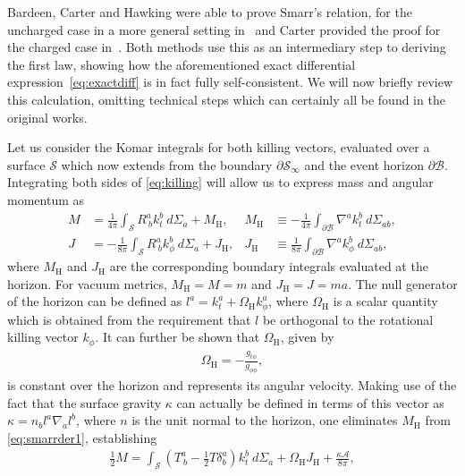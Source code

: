\documentclass[
twoside,
openright,
frontopenright
]{dmathesis}
\newcommand{\nn}{\nonumber}
\begin{document}
Bardeen, Carter and Hawking were able to prove Smarr's relation, for the
uncharged case in a more general setting in~\cite{Bardeen:1973gs} and Carter
provided the proof for the charged case
in~\cite{Carter:1973rla,Carter2010}. Both methods use this as an intermediary
step to deriving the first law, showing how the aforementioned exact
differential expression~\eqref{eq:exactdiff} is in fact fully
self-consistent. We will now briefly review this calculation, omitting technical
steps which can certainly all be found in the original works.

Let us consider the Komar integrals for both killing vectors, evaluated over a
surface $\mathcal{S}$ which now extends from the boundary
$\partial \mathcal{S}_\infty$ and the event horizon $\partial
\mathcal{B}$. Integrating both sides of \cref{eq:killing} will allow us to
express mass and angular momentum as
\begin{align}
  M &= \frac{1}{4\pi}\int_\mathcal{S} R^a_{~b}k^b_t ~d\Sigma_a + M_\mathrm{H}, 
  &M_\mathrm{H} &\equiv -\frac{1}{4\pi}\int_{\partial \mathcal{B}}\nabla^a k_t^b ~ d\Sigma_{ab},\nn\\
  J &= -\frac{1}{8\pi}\int_\mathcal{S} R^a_{~b}k^b_\phi ~d\Sigma_a + J_\mathrm{H}, 
  &J_\mathrm{H} &\equiv \frac{1}{8\pi}\int_{\partial\mathcal{B}}\nabla^a k_\phi^b ~ d\Sigma_{ab},
\label{eq:smarrder1}
\end{align}
where $M_\mathrm{H}$ and $J_\mathrm{H}$ are the corresponding boundary integrals
evaluated at the horizon. For vacuum metrics, $M_\mathrm{H}=M=m$ and
$J_\mathrm{H}=J=ma$. The null generator of the horizon can be defined as
$l^a = k_t^a + \Omega_\mathrm{H} k_\phi^a$, where $\Omega_\mathrm{H}$ is a
scalar quantity which is obtained from the requirement that $l$ be orthogonal to
the rotational killing vector $k_\phi$. It can further be shown that
$\Omega_\mathrm{H}$, given by
\begin{align}
  \label{eq:angularvelocity}
  \Omega_\mathrm{H} = -\frac{g_{t\phi}}{g_{\phi\phi}},
\end{align}
is constant over the horizon and represents its angular velocity. Making use of
the fact that the surface gravity $\kappa$ can actually be defined in terms of
this vector as $\kappa = n_bl^a\nabla_al^b$, where $n$ is the unit normal to the
horizon, one eliminates $M_\mathrm{H}$ from \cref{eq:smarrder1}, establishing
\begin{align}
  \label{eq:smarrder2}
  \frac12 M = \int_\mathcal{S} \left(T^a_{~b} - \frac12 T \delta^a_b\right)k_t^b~d\Sigma_a + \Omega_\mathrm{H}
  J_\mathrm{H} + \frac{\kappa \mathcal{A}}{8\pi},
\end{align}
\end{document}
